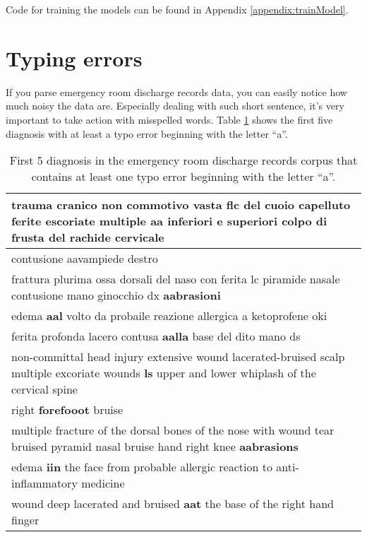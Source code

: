 Code for training the models can be found in Appendix \ref{appendix:trainModel}.

\section{Typing errors}

If you parse emergency room discharge records data, you can easily notice how much noisy the data are. Especially dealing with such short sentence, it's very important to take action with misspelled words. 
Table \ref{tab:tableTypingErrors} shows the first five diagnosis with at least a typo error beginning with the letter \enquote{a}. \\

\begin{table}[h!]
	\begin{center}  
		\caption[First 5 diagnosis that contains at least one typo error beginning with the letter \enquote{a}]{First 5 diagnosis in the emergency room discharge records corpus that contains at least one typo error beginning with the letter \enquote{a}.} 
		\label{tab:tableTypingErrors}
		\begin{tabular}{|p{\linewidth}|} 
			\hline
			trauma cranico non commotivo vasta flc del cuoio capelluto ferite escoriate multiple \textbf{aa} inferiori e superiori colpo di frusta del rachide cervicale	\\ \hline
			contusione aavampiede destro	\\ \hline
			frattura plurima ossa dorsali del naso con ferita lc piramide nasale contusione mano ginocchio dx \textbf{aabrasioni}	\\ \hline
			edema \textbf{aal} volto da probaile reazione allergica a ketoprofene oki	\\ \hline
			ferita profonda lacero contusa \textbf{aalla} base del dito mano ds	\\ \hline \hline
			non-committal head injury extensive wound lacerated-bruised scalp multiple excoriate wounds \textbf{ls} upper and lower whiplash of the cervical spine	\\ \hline
			right \textbf{forefooot} bruise	\\ \hline
			multiple fracture of the dorsal bones of the nose with wound tear bruised pyramid nasal bruise hand right knee \textbf{aabrasions}	\\ \hline
			edema \textbf{iin} the face from probable allergic reaction to anti-inflammatory medicine \\ \hline
			wound deep lacerated and bruised \textbf{aat} the base of the right hand finger	\\ \hline
		\end{tabular} 
	\end{center}
\end{table}

